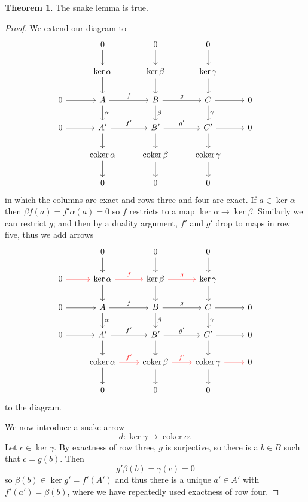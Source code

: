 \documentclass[10pt]{article}
\newcommand{\coker}{\operatorname{coker}}
\theoremstyle{definition}
\newtheorem{theorem}[lemma]{Theorem}
\begin{document}
\begin{theorem}
The snake lemma is true.
\end{theorem}
\begin{proof}
We extend our diagram to
$$\begin{tikzcd}
& 0 \arrow[d] & 0 \arrow[d] & 0 \arrow[d] \\
& \ker \alpha \arrow[d] & \ker \beta \arrow[d] & \ker \gamma \arrow[d] \\
0 \arrow[r] & A \arrow[r,"f"] \arrow[d,"\alpha"] & B \arrow[r,"g"] \arrow[d,"\beta"] & C \arrow[r] \arrow[d,"\gamma"] & 0\\
0 \arrow[r] & A' \arrow[r,"f'"] \arrow[d] & B' \arrow[r, "g'"] \arrow[d] & C' \arrow[r] \arrow[d] & 0\\
 & \coker \alpha \arrow[d] & \coker \beta \arrow[d] & \coker \gamma \arrow[d]\\
 & 0 & 0 & 0
\end{tikzcd}$$
in which the columns are exact and rows three and four are exact.
If $a \in \ker \alpha$ then $\beta f(a) = f' \alpha(a) = 0$ so $f$ restricts to a map $\ker \alpha \to \ker \beta$. Similarly we can restrict $g$; and then by a duality argument, $f'$ and $g'$ drop to maps in row five, thus we add arrows
$$\begin{tikzcd}
& 0 \arrow[d] & 0 \arrow[d] & 0 \arrow[d] \\
0 \arrow[color=red,r] & \ker \alpha \arrow[r,"f",color=red]\arrow[d] & \ker \beta \arrow[r,"g",color=red]\arrow[d] & \ker \gamma \arrow[d] \\
0 \arrow[r] & A \arrow[r,"f"] \arrow[d,"\alpha"] & B \arrow[r,"g"] \arrow[d,"\beta"] & C \arrow[r] \arrow[d,"\gamma"] & 0\\
0 \arrow[r] & A' \arrow[r,"f'"] \arrow[d] & B' \arrow[r, "g'"] \arrow[d] & C' \arrow[r] \arrow[d] & 0\\
 & \coker \alpha \arrow[d] \arrow[r,"f'", color=red] & \coker \beta \arrow[r,"f'", color=red]\arrow[d] & \coker \gamma \arrow[d] \arrow[r,color=red] & 0\\
 & 0 & 0 & 0
\end{tikzcd}$$
to the diagram.

We now introduce a snake arrow
$$d: \ker \gamma \to \coker \alpha.$$
Let $c \in \ker \gamma$. By exactness of row three, $g$ is surjective, so there is a $b \in B$ such that $c = g(b)$.
Then
$$g'\beta(b) = \gamma(c) = 0$$
so $\beta(b) \in \ker g' = f'(A')$ and thus there is a unique $a' \in A'$ with $f'(a') = \beta(b)$, where we have repeatedly used exactness of row four.


\end{proof}
\end{document}
